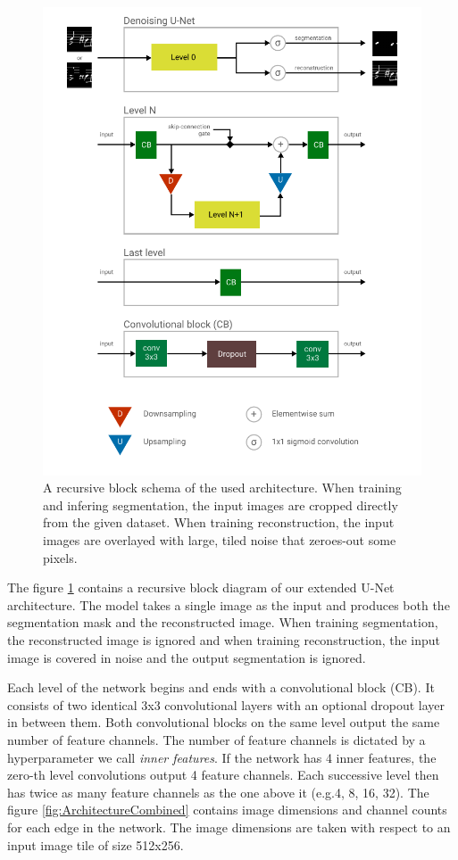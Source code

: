 \begin{figure}[p]
    \centering
    \includegraphics[width=140mm]{../img/architecture-pieces.pdf}
    \caption{A recursive block schema of the used architecture. When training and infering segmentation, the input images are cropped directly from the given dataset. When training reconstruction, the input images are overlayed with large, tiled noise that zeroes-out some pixels.}
    \label{fig:ArchitecturePieces}
\end{figure}

The figure \ref{fig:ArchitecturePieces} contains a recursive block diagram of our extended U-Net architecture. The model takes a single image as the input and produces both the segmentation mask and the reconstructed image. When training segmentation, the reconstructed image is ignored and when training reconstruction, the input image is covered in noise and the output segmentation is ignored.

Each level of the network begins and ends with a convolutional block (CB). It consists of two identical 3x3 convolutional layers with an optional dropout layer in between them. Both convolutional blocks on the same level output the same number of feature channels. The number of feature channels is dictated by a hyperparameter we call \emph{inner features}. If the network has 4 inner features, the zero-th level convolutions output 4 feature channels. Each successive level then has twice as many feature channels as the one above it (e.g.\@ 4, 8, 16, 32). The figure \ref{fig:ArchitectureCombined} contains image dimensions and channel counts for each edge in the network. The image dimensions are taken with respect to an input image tile of size 512x256.

